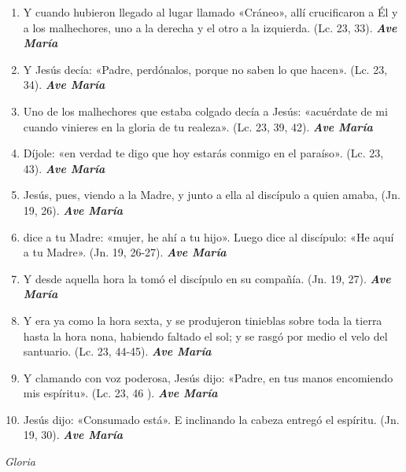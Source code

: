 \documentclass[a4paper,11pt, oneside]{report}
\begin{document}
\begin{enumerate}
  
  \item Y cuando hubieron llegado al lugar llamado «Cráneo», allí crucificaron a Él y a los malhechores, uno a la derecha y el otro a la izquierda. 
  (Lc. 23, 33). \textbf{\textit{Ave María}}

  \item Y Jesús decía: «Padre, perdónalos, porque no saben lo que hacen». (Lc. 23, 34). \textbf{\textit{Ave María}}

  \item Uno de los malhechores que estaba colgado decía a Jesús: «acuérdate de mi cuando vinieres en la gloria de tu realeza». 
  (Lc. 23, 39, 42). \textbf{\textit{Ave María}}

  \item Díjole: «en verdad te digo que hoy estarás conmigo en el paraíso». (Lc. 23, 43). \textbf{\textit{Ave María}}

  \item Jesús, pues, viendo a la Madre, y junto a ella al discípulo a quien amaba, (Jn. 19, 26). \textbf{\textit{Ave María}}

  \item dice a tu Madre: «mujer, he ahí a tu hijo». Luego dice al discípulo: «He aquí a tu Madre». (Jn. 19, 26-27). \textbf{\textit{Ave María}}

  \item Y desde aquella hora la tomó el discípulo en su compañía. (Jn. 19, 27). \textbf{\textit{Ave María}}

  \item Y era ya como la hora sexta, y se produjeron tinieblas sobre toda la tierra hasta la hora nona, 
  habiendo faltado el sol; y se rasgó por medio el velo del santuario. (Lc. 23, 44-45). \textbf{\textit{Ave María}}

  \item Y clamando con voz poderosa, Jesús dijo: «Padre, en tus manos encomiendo mis espíritu». (Lc. 23, 46 ). \textbf{\textit{Ave María}}

  \item Jesús dijo: «Consumado está». E inclinando la cabeza entregó el espíritu. (Jn. 19, 30). \textbf{\textit{Ave María}}

\end{enumerate}

\indent\textit{Gloria} \par      
\end{document}
